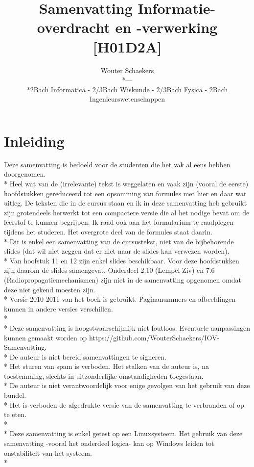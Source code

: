 \documentclass[10pt]{article}
\title{Samenvatting Informatie-overdracht en -verwerking [H01D2A]}
\author{Wouter Schaekers\\*---\\*2Bach Informatica - 2/3Bach Wiskunde - 2/3Bach Fysica - 2Bach Ingenieurswetenschappen}
\begin{document}
\maketitle
\setcounter{section}{-1}
\setcounter{page}{0}
\renewcommand{\contentsname}{Inhoudstafel}
\setcounter{tocdepth}{3}
\tableofcontents
\clearpage
\section{Inleiding}
Deze samenvatting is bedoeld voor de studenten die het vak al eens hebben doorgenomen.\\*
Heel wat van de (irrelevante) tekst is weggelaten en vaak zijn (vooral de eerste) hoofdstukken gereduceerd tot een opsomming van formules met hier en daar wat uitleg. De teksten die in de cursus staan en ik in deze samenvatting heb gebruikt zijn grotendeels herwerkt tot een compactere versie die al het nodige bevat om de leerstof te kunnen begrijpen. Ik raad ook aan het formularium te raadplegen tijdens het studeren. Het overgrote deel van de formules staat daarin.\\*
Dit is enkel een samenvatting van de cursustekst, niet van de bijbehorende slides (dat wil niet zeggen dat er niet naar de slides kan verwezen worden).\\*
Van hoofstuk 11 en 12 zijn enkel slides beschikbaar. Voor deze hoofdstukken zijn daarom de slides samengevat. Onderdeel 2.10 (Lempel-Ziv) en 7.6 (Radiopropagatiemechanismen) zijn niet in de samenvatting opgenomen omdat deze niet gekend moesten zijn.\\*
Versie 2010-2011 van het boek is gebruikt. Paginanummers en afbeeldingen kunnen in andere versies verschillen.\\*\\*
Deze samenvatting is hoogstwaarschijnlijk niet foutloos. Eventuele aanpassingen kunnen gemaakt worden op https://github.com/WouterSchaekers/IOV-Samenvatting.\\*
De auteur is niet bereid samenvattingen te signeren.\\*
Het sturen van spam is verboden. Het stalken van de auteur is, na toestemming, slechts in uitzonderlijke omstandigheden toegestaan.\\*
De auteur is niet verantwoordelijk voor enige gevolgen van het gebruik van deze bundel.\\*
Het is verboden de afgedrukte versie van de samenvatting te verbranden of op te eten.\\*\\*
Deze samenvatting is enkel getest op een Linuxsysteem. Het gebruik van deze samenvatting -vooral het onderdeel logica- kan op Windows leiden tot onstabiliteit van het systeem.\\*
\end{document}
